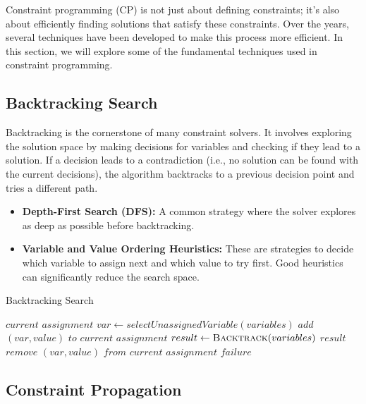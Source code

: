 Constraint programming (CP) is not just about defining constraints; it's also about efficiently finding solutions that satisfy these constraints. Over the years, several techniques have been developed to make this process more efficient. In this section, we will explore some of the fundamental techniques used in constraint programming.

\subsection{Backtracking Search}

Backtracking is the cornerstone of many constraint solvers. It involves exploring the solution space by making decisions for variables and checking if they lead to a solution. If a decision leads to a contradiction (i.e., no solution can be found with the current decisions), the algorithm backtracks to a previous decision point and tries a different path.

\begin{itemize}
    \item \textbf{Depth-First Search (DFS):} A common strategy where the solver explores as deep as possible before backtracking.
    \item \textbf{Variable and Value Ordering Heuristics:} These are strategies to decide which variable to assign next and which value to try first. Good heuristics can significantly reduce the search space.
\end{itemize}

\begin{algorithm}
\caption{Backtracking Search}
\begin{algorithmic}[1]
        \State \Return $current$ $assignment$
    \EndIf
    \State $var \gets selectUnassignedVariable(variables)$
            \State $add$ $(var, value)$ $to$ $current$ $assignment$
            \State $result \gets \Call{Backtrack}{variables}$
                \State \Return $result$
            \EndIf
            \State $remove$ $(var, value)$ $from$ $current$ $assignment$
        \EndIf
    \EndFor
    \State \Return $failure$
\EndProcedure
\end{algorithmic}
\end{algorithm}


\subsection{Constraint Propagation}

